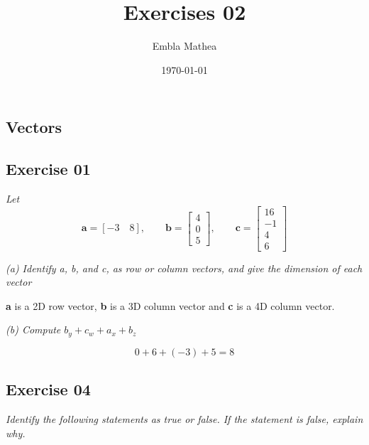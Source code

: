 \documentclass[12pt, a4paper]{article}
\title{Exercises 02}
\author{Embla Mathea}
\date{\today}
\begin{document}
\maketitle

\begin{center}
	\section*{Vectors}	
\end{center}

\subsection*{Exercise 01}

\textit{Let}
\begin{equation}
		\tag*{}
		\mathbf{a} = \left[-3\quad8\right], \qquad			
		\mathbf{b} =
		\begin{bmatrix}
		4\\0\\5
		\end{bmatrix}, \qquad		
		\mathbf{c} =
		\begin{bmatrix}
		16\\-1\\4\\6
		\end{bmatrix}
\end{equation}

\textit{(a) Identify a, b, and c, as row or column vectors, and give the dimension
of each vector}

	\begin{center}
		\textbf{a} is a 2D row vector, \textbf{b} is a 3D column vector 	
		and \textbf{c} is a 4D column vector. \\
	\end{center}

\textit{(b) Compute $b_y + c_w + a_x + b_z$}

	\begin{equation}
		\tag*{}
		0 + 6 + (-3) + 5 = 8
	\end{equation}
	
\subsection*{Exercise 04}

\textit
{
	Identify the following statements as true or false. If the
	statement is false, explain why.\\
}
\end{document}
